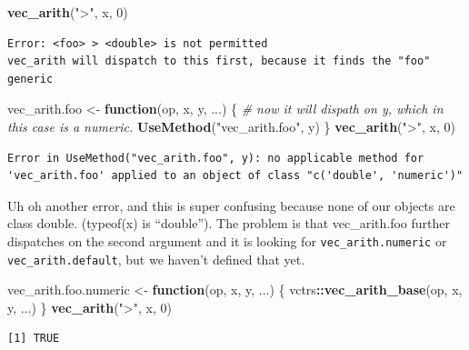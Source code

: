 \documentclass[]{book}
\newenvironment{Shaded}{\begin{snugshade}}{\end{snugshade}}
\newcommand{\CommentTok}[1]{\textcolor[rgb]{0.56,0.35,0.01}{\textit{#1}}}
\newcommand{\ControlFlowTok}[1]{\textcolor[rgb]{0.13,0.29,0.53}{\textbf{#1}}}
\newcommand{\DecValTok}[1]{\textcolor[rgb]{0.00,0.00,0.81}{#1}}
\newcommand{\KeywordTok}[1]{\textcolor[rgb]{0.13,0.29,0.53}{\textbf{#1}}}
\newcommand{\NormalTok}[1]{#1}
\newcommand{\OperatorTok}[1]{\textcolor[rgb]{0.81,0.36,0.00}{\textbf{#1}}}
\newcommand{\StringTok}[1]{\textcolor[rgb]{0.31,0.60,0.02}{#1}}
\begin{document}
\begin{Shaded}
\begin{Highlighting}[]
\KeywordTok{vec_arith}\NormalTok{(}\StringTok{">"}\NormalTok{, x, }\DecValTok{0}\NormalTok{) }
\end{Highlighting}
\end{Shaded}

\begin{verbatim}
Error: <foo> > <double> is not permitted
vec_arith will dispatch to this first, because it finds the "foo" generic
\end{verbatim}

\begin{Shaded}
\begin{Highlighting}[]
\NormalTok{vec_arith.foo <-}\StringTok{ }\ControlFlowTok{function}\NormalTok{(op, x, y, ...) \{}
  \CommentTok{# now it will dispath on y, which in this case is a numeric.}
  \KeywordTok{UseMethod}\NormalTok{(}\StringTok{"vec_arith.foo"}\NormalTok{, y)}
\NormalTok{\}}
\KeywordTok{vec_arith}\NormalTok{(}\StringTok{">"}\NormalTok{, x, }\DecValTok{0}\NormalTok{) }
\end{Highlighting}
\end{Shaded}

\begin{verbatim}
Error in UseMethod("vec_arith.foo", y): no applicable method for 'vec_arith.foo' applied to an object of class "c('double', 'numeric')"
\end{verbatim}

Uh oh another error, and this is super confusing because none of our objects are class double. (typeof(x) is ``double''). The problem is that vec\_arith.foo further dispatches on the second argument and it is looking for \texttt{vec\_arith.numeric} or \texttt{vec\_arith.default}, but we haven't defined that yet.

\begin{Shaded}
\begin{Highlighting}[]
\NormalTok{vec_arith.foo.numeric <-}\StringTok{ }\ControlFlowTok{function}\NormalTok{(op, x, y, ...) \{}
\NormalTok{  vctrs}\OperatorTok{::}\KeywordTok{vec_arith_base}\NormalTok{(op, x, y, ...)}
\NormalTok{\}}
\KeywordTok{vec_arith}\NormalTok{(}\StringTok{">"}\NormalTok{, x, }\DecValTok{0}\NormalTok{)}
\end{Highlighting}
\end{Shaded}

\begin{verbatim}
[1] TRUE
\end{verbatim}
\end{document}
